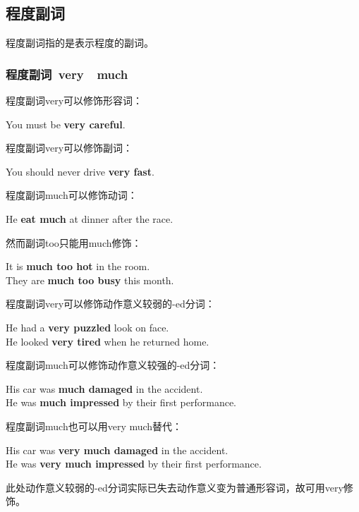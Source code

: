 \documentclass[UTF8]{ctexart}
\newcommand{\littf}[1]{{\hspace{3pt}\ttfamily #1}}
\begin{document}
\newpage

\subsection{程度副词}
    程度副词指的是表示程度的副词。

\subsubsection{程度副词~\littf{very}~~\littf{much}}
    程度副词\littf{very}可以修饰形容词：
    \begin{center}
        \large\ttfamily
        You must be \textbf{very careful}.\\[6mm]
    \end{center}
    程度副词\littf{very}可以修饰副词：
    \begin{center}
        \large\ttfamily
        You should never drive \textbf{very fast}.\\[6mm]
    \end{center}
    程度副词\littf{much}可以修饰动词：
    \begin{center}
        \large\ttfamily
        He \textbf{eat much} at dinner after the race.\\[6mm]
    \end{center}
    然而副词\littf{too}只能用\littf{much}修饰：
    \begin{center}
        \large\ttfamily
        It is \textbf{much too hot} in the room.\\[3mm]
        They are \textbf{much too busy} this month.\\[6mm]
    \end{center}
    程度副词\littf{very}可以修饰动作意义较弱的\littf{-ed}分词：
    \begin{center}
        \large\ttfamily
        He had a \textbf{very puzzled} look on face.\\[3mm]
        He looked \textbf{very tired} when he returned home.\\[6mm]
    \end{center}
    程度副词\littf{much}可以修饰动作意义较强的\littf{-ed}分词：
    \begin{center}
        \large\ttfamily
        His car was \textbf{much damaged} in the accident.\\[3mm]
        He was \textbf{much impressed} by their first performance.\\[6mm]
    \end{center}
    程度副词\littf{much}也可以用\littf{very much}替代：
    \begin{center}
        \large\ttfamily
        His car was \textbf{very much damaged} in the accident.\\[3mm]
        He was \textbf{very much impressed} by their first performance.\\[6mm]
    \end{center}
    此处动作意义较弱的\littf{-ed}分词实际已失去动作意义变为普通形容词，故可用\littf{very}修饰。
\end{document}
